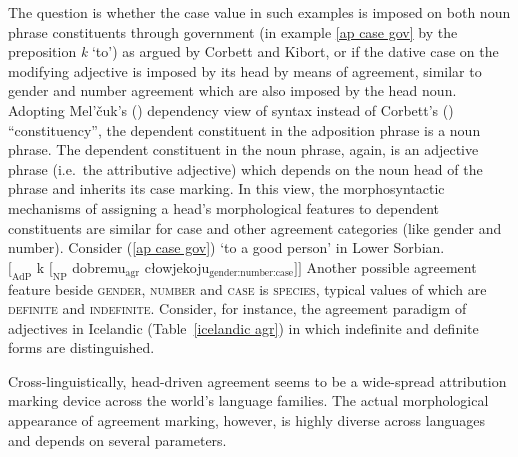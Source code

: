The question is whether the case value in such examples is imposed on both noun phrase constituents through government (in example \ref{ap case gov} by the preposition \textit{k} ‘to’) as argued by Corbett and Kibort, or if the dative case on the modifying adjective is imposed by its head by means of agreement, similar to gender and number agreement which are also imposed by the head noun. Adopting Mel'čuk's (\citeyear[329, 337]{melcuk1993}) dependency view of syntax instead of Corbett's (\citeyear[133]{corbett2006}) “constituency”, the dependent constituent in the adposition phrase is a noun phrase. The dependent constituent in the noun phrase, again, is an adjective phrase (i.e.~the attributive adjective) which depends on the noun head of the phrase and inherits its case marking. In this view, the morphosyntactic mechanisms of assigning a head's morphological features to dependent constituents are similar for case and other agreement categories (like gender and number). Consider (\ref{ap case gov}) ‘to a good person’ in Lower Sorbian.
\ea
{}\\
$[_\textrm{AdP}$ k $[_\textrm{NP}$ dobremu$_\textrm{agr}$ cłowjekoju$_\textrm{gender:number:case} ] ]$
\z
Another possible agreement feature beside \textsc{gender, number} and \textsc{case} is \textsc{species}, typical values of which are \textsc{definite} and \textsc{indefinite}. Consider, for instance, the agreement paradigm of adjectives in Icelandic (Table~\ref{icelandic agr}) in which indefinite and definite forms are distinguished.

Cross-linguistically, head\hyp{}driven agreement seems to be a wide-spread attribution marking device across the world's language families. The actual morphological appearance of agreement marking, however, is highly diverse across languages and depends on several parameters.

